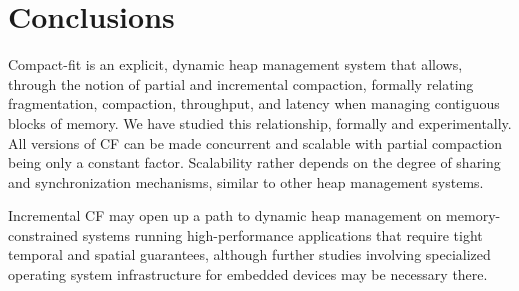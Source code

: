 \documentclass{amsart}
\begin{document}
\section{Conclusions}
\label{sec:conc}

Compact-fit is an explicit, dynamic heap management system that
allows, through the notion of partial and incremental compaction,
formally relating fragmentation, compaction, throughput, and latency
when managing contiguous blocks of memory.  We have studied this
relationship, formally and experimentally.  All versions of CF can be
made concurrent and scalable with partial compaction being only a
constant factor.  Scalability rather depends on the degree of sharing and
synchronization mechanisms, similar to other heap management
systems.



Incremental CF may open up a path to dynamic heap
management on memory-constrained systems running high-performance
applications that require tight temporal and spatial guarantees, although
further studies involving specialized operating system
infrastructure for embedded devices may be necessary there.



\end{document}
